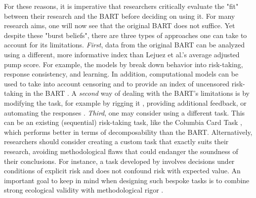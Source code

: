 \documentclass[serif, twocolumn, authordate, meta]{jote-article}
\begin{document}
For these reasons, it is imperative that researchers critically evaluate the "fit" between their research and the BART before deciding on using it. For many research aims, one will now see that the original BART does not suffice. Yet despite these "burst beliefs", there are three types of approaches one can take to account for its limitations. \emph{First}, data from the original BART can be analyzed using a different, more informative index than Lejuez et al.'s average adjusted pump score. For example, the models by \textcite{Wallsten2005} break down behavior into risk-taking, response consistency, and learning. In addition, computational models can be used to take into account censoring and to provide an index of uncensored risk-taking in the BART \parencite{Dijkstra2020, Tobin1958, Weller2019, Young2019}. A \emph{second} way of dealing with the BART's limitations is by modifying the task, for example by rigging it \parencite{Figner2009,Slovic1966}, providing additional feedback, or automating the responses \parencite{Pleskac2008}. \emph{Third}, one may consider using a different task. This can be an existing (sequential) risk-taking task, like the Columbia Card Task \parencite{Figner2009}, which performs better in terms of decomposability than the BART. Alternatively, researchers should consider creating a custom task that exactly suits their research, avoiding methodological flaws that could endanger the soundness of their conclusions. For instance, a task developed by \textcite{Schmidt2013} involves decisions under conditions of explicit risk and does not confound risk with expected value. An important goal to keep in mind when designing such bespoke tasks is to combine strong ecological validity with methodological rigor \parencite{Schonberg2011}.
\end{document}
